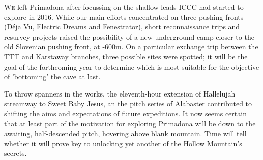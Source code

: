 \newpage
 \thispagestyle{endchapter}
\begin{tcolorbox}
	\vspace{80pt}
	\lettrine{W}{e} left Primadona after focussing on the shallow leads ICCC had started to explore in 2016. While our main efforts concentrated on three pushing fronts (Déja Vu, Electric Dreams and Fenestrator), short reconnaissance trips and resurvey projects raised the possibility of a new underground camp closer to the old Slovenian pushing front, at -600m. On a particular exchange trip between the TTT and Karstaway branches, three possible sites were spotted; it will be the goal of the forthcoming year to determine which is most suitable for the objective of 'bottoming' the cave at last. 

	To throw spanners in the works, the eleventh-hour extension of Hallelujah streamway to Sweet Baby Jesus, an the pitch series of Alabaster contributed to shifting the aims and expectations of future expeditions. It now seems certain that at least part of the motivation for exploring Primadona will be down to the awaiting, half-descended pitch, hovering above blank mountain. Time will tell whether it will prove key to unlocking yet another of the Hollow Mountain's secrets.

\end{tcolorbox}

\BgThispage

